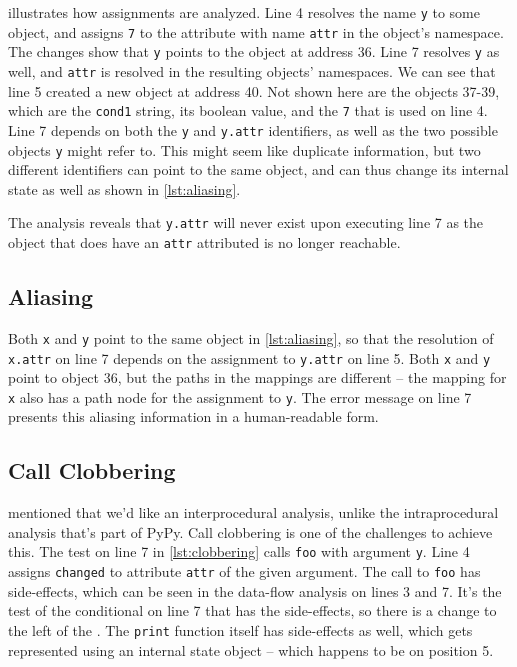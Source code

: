 \documentclass[a4paper, 16pt, oneside]{Thesis}
\begin{document}


 illustrates how assignments are analyzed. Line 4
resolves the name \texttt{y} to some object, and assigns \texttt{7} to
the attribute with name \texttt{attr} in the object's namespace. The
changes show that \texttt{y} points to the object at address 36. Line 7
resolves \texttt{y} as well, and \texttt{attr} is resolved in the
resulting objects' namespaces. We can see that line 5 created a new
object at address 40. Not shown here are the objects 37-39, which are
the \texttt{\textquotesingle{}cond1\textquotesingle{}} string, its
boolean value, and the \texttt{7} that is used on line 4. Line 7 depends
on both the \texttt{y} and \texttt{y.attr} identifiers, as well as the
two possible objects \texttt{y} might refer to. This might seem like
duplicate information, but two different identifiers can point to the
same object, and can thus change its internal state as well as shown in
\cref{lst:aliasing}.

The analysis reveals that \texttt{y.attr} will never exist upon
executing line 7 as the object that does have an \texttt{attr}
attributed is no longer reachable.

\clearpage 

\subsection{Aliasing}\label{aliasing}



Both \texttt{x} and \texttt{y} point to the same object in
\cref{lst:aliasing}, so that the resolution of \texttt{x.attr} on line 7
depends on the assignment to \texttt{y.attr} on line 5. Both \texttt{x}
and \texttt{y} point to object 36, but the paths in the mappings are
different -- the mapping for \texttt{x} also has a path node for the
assignment to \texttt{y}. The error message on line 7 presents this
aliasing information in a human-readable form.

\subsection{Call Clobbering}\label{call-clobbering}



 mentioned that we'd like an interprocedural analysis,
unlike the intraprocedural analysis that's part of PyPy. Call clobbering
is one of the challenges to achieve this. The test on line 7 in
\cref{lst:clobbering} calls \texttt{foo} with argument \texttt{y}. Line
4 assigns \texttt{\textquotesingle{}changed\textquotesingle{}} to
attribute \texttt{attr} of the given argument. The call to \texttt{foo}
has side-effects, which can be seen in the data-flow analysis on lines 3
and 7. It's the test of the conditional on line 7 that has the
side-effects, so there is a change to the left of the
\texttt{\textbar{}}. The \texttt{print} function itself has side-effects
as well, which gets represented using an internal state object -- which
happens to be on position 5.
\end{document}
